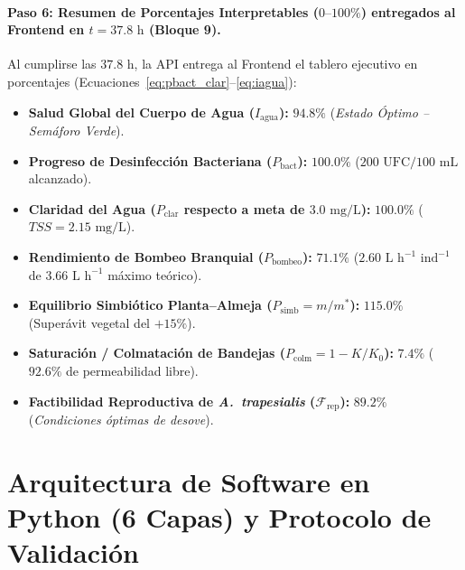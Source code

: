 \documentclass[11pt,letterpaper]{article}
\begin{document}
\paragraph{Paso 6: Resumen de Porcentajes Interpretables ($0\text{--}100\%$) entregados al Frontend en $t = 37.8\text{ h}$ (Bloque 9).}
Al cumplirse las $37.8\text{ h}$, la API entrega al Frontend el tablero ejecutivo en porcentajes (Ecuaciones~\ref{eq:pbact_clar}--\ref{eq:iagua}):
\begin{itemize}[leftmargin=1.5em,noitemsep]
    \item \textbf{Salud Global del Cuerpo de Agua ($I_{\text{agua}}$):} $\mathbf{94.8\%}$ (\textit{Estado Óptimo -- Semáforo Verde}).
    \item \textbf{Progreso de Desinfección Bacteriana ($P_{\text{bact}}$):} $\mathbf{100.0\%}$ ($200\text{ UFC}/100\text{ mL}$ alcanzado).
    \item \textbf{Claridad del Agua ($P_{\text{clar}}$ respecto a meta de $3.0\text{ mg/L}$):} $\mathbf{100.0\%}$ ($TSS = 2.15\text{ mg/L}$).
    \item \textbf{Rendimiento de Bombeo Branquial ($P_{\text{bombeo}}$):} $\mathbf{71.1\%}$ ($2.60\text{ L h}^{-1}\text{ ind}^{-1}$ de $3.66\text{ L h}^{-1}$ máximo teórico).
    \item \textbf{Equilibrio Simbiótico Planta--Almeja ($P_{\text{simb}} = m/m^*$):} $\mathbf{115.0\%}$ (Superávit vegetal del $+15\%$).
    \item \textbf{Saturación / Colmatación de Bandejas ($P_{\text{colm}} = 1 - K/K_0$):} $\mathbf{7.4\%}$ ($92.6\%$ de permeabilidad libre).
    \item \textbf{Factibilidad Reproductiva de \textit{A.\ trapesialis} ($\mathcal{F}_{\text{rep}}$):} $\mathbf{89.2\%}$ (\textit{Condiciones óptimas de desove}).
\end{itemize}

\newpage
\section{Arquitectura de Software en Python (6 Capas) y Protocolo de Validación}
\end{document}
